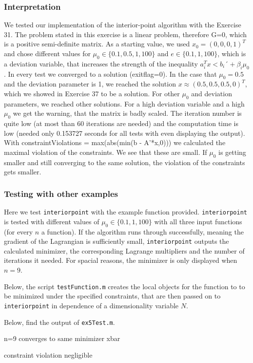 \documentclass{article}
\begin{document}
\subsubsection{Interpretation}
We tested our implementation of the interior-point algorithm with the Exercise 31. The problem stated in this exercise is a linear problem, therefore G=0, which is a positive semi-definite matrix. As a starting value, we used $x_0=(0,0,0,1)^T$ and chose different values for $\mu_0 \in \{0.1,0.5,1,100\}$ and $e \in \{0.1,1,100\}$, which is a deviation variable, that increases the strength of the inequality $a_i^T x < b_i ´+ \beta_i \mu_0$. In every test we converged to a solution (exitflag=0). In the case that $\mu_0=0.5$ and the deviation parameter is 1, we reached the solution $x \approx (0.5,0.5,0.5,0)^T$, which we showed in Exercise 37 to be a solution. For other $\mu_0$ and deviation parameters, we reached other solutions. For a high deviation variable and a high $\mu_0$ we get the warning, that the matrix is badly scaled. The iteration number is quite low (at most than 60 iterations are needed) and the computation time is low (needed only 0.153727 seconds for all tests with even displaying the output). With  constraintViolations = max(abs(min(b - A'*x,0))) we calculated the maximal violation of the constraints. We see that these are small. If $\mu_0$ is getting smaller and still converging to the same solution, the violation of the constraints gets smaller.      
\subsubsection{Testing with other examples}
Here we test \texttt{interiorpoint} with the example function provided. \texttt{interiorpoint} is tested with different values of $\mu_0\in\lbrace0.1,1,100\rbrace$ with all three input functions (for every $n$ a function). If the algorithm runs through successfully, meaning the gradient of the Lagrangian is sufficiently small, \texttt{interiorpoint} outputs the calculated minimizer, the corresponding Lagrange multipliers and the number of iterations it needed. For spacial reasons, the minimizer is only displayed when $n=9$.
 
Below, the script \texttt{testFunction.m} creates the local objects for the function to to be minimized under the specified constraints, that are then passed on to \texttt{interiorpoint} in dependence of a dimensionality variable $N$.

Below, find the output of \texttt{ex5Test.m}. 


n=9 converges to same minimizer xbar

constraint violation negligible
\end{document}
